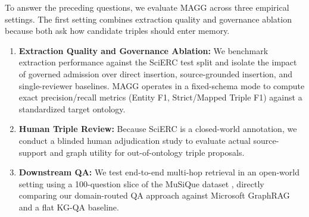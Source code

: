 \documentclass{article}
\newcommand{\system}{\textsc{MAGG}}
\begin{document}


To answer the preceding questions, we evaluate \system{} across three empirical settings. The
first setting combines extraction quality and governance ablation because both ask how candidate
triples should enter memory.

\begin{enumerate}[leftmargin=*]
    \item \textbf{Extraction Quality and Governance Ablation:} We benchmark extraction performance against the SciERC test split and isolate the impact of governed admission over direct insertion, source-grounded insertion, and single-reviewer baselines. \system{} operates in a fixed-schema mode to compute exact precision/recall metrics (Entity F1, Strict/Mapped Triple F1) against a standardized target ontology.
    \item \textbf{Human Triple Review:} Because SciERC is a closed-world annotation, we conduct a blinded human adjudication study to evaluate actual source-support and graph utility for out-of-ontology triple proposals.
    \item \textbf{Downstream QA:} We test end-to-end multi-hop retrieval in an open-world setting using a 100-question slice of the MuSiQue dataset \citep{trivedi2022musique}, directly comparing our domain-routed QA approach against Microsoft GraphRAG and a flat KG-QA baseline.
\end{enumerate}
\end{document}
